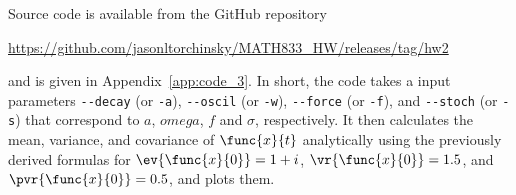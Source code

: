 Source code is available from the GitHub repository
	
\begin{center}
	\url{https://github.com/jasonltorchinsky/MATH833_HW/releases/tag/hw2}
\end{center}

and is given in Appendix~\ref{app:code_3}. In short, the code takes a input parameters \texttt{-{}-decay} (or \texttt{-a}), \texttt{-{}-oscil} (or \texttt{-w}), \texttt{-{}-force} (or \texttt{-f}), and \texttt{-{}-stoch} (or \texttt{-s}) that correspond to $a$, $omega$, $f$ and $\sigma$, respectively. It then calculates the mean, variance, and covariance of $\func{x}{t}$ analytically using the previously derived formulas for $\ev{\func{x}{0}} = 1 + i$, $\vr{\func{x}{0}} = 1.5$, and $\pvr{\func{x}{0}} = 0.5$, and plots them.
